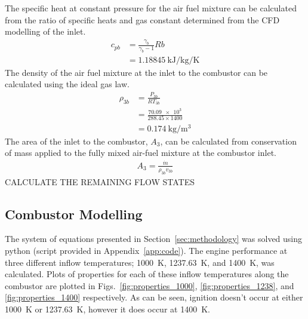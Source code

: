 \documentclass[a4paper]{article}
\begin{document}
The specific heat at constant pressure for the air fuel mixture can be calculated from the ratio of specific heats and gas constant determined from the CFD modelling of the inlet.
\begin{align}
    c_{pb} &= \frac{\gamma_b}{\gamma_b - 1}Rb\\
    &= \SI{1.18845}{\kJ\per\kg\per\K}
\end{align}
The density of the air fuel mixture at the inlet to the combustor can be calculated using the ideal gas law.
\begin{align}
    \rho_{3b} &= \frac{P_{3b}}{RT_{3b}}\\
    &= \frac{\num{70.09e3}}{288.45 \times 1400}\\
    &= \SI{0.174}{\kg\per\m\cubed}
\end{align}
The area of the inlet to the combustor, \(A_3\), can be calculated from conservation of mass applied to the fully mixed air-fuel mixture at the combustor inlet.
\begin{align}
    A_3 = \frac{\dot{m}}{\rho_{3b} v_{3b}}
\end{align}
CALCULATE THE REMAINING FLOW STATES


\subsection{Combustor Modelling}
The system of equations presented in Section~\ref{sec:methodology} was solved using python (script provided in Appendix~\ref{app:code}). The engine performance at three different inflow temperatures; 1000~K, 1237.63~K, and 1400~K, was calculated. Plots of properties for each of these inflow temperatures along the combustor are plotted in Figs.~\ref{fig:properties_1000}, \ref{fig:properties_1238}, and \ref{fig:properties_1400} respectively. As can be seen, ignition doesn't occur at either 1000~K or 1237.63~K, however it does occur at 1400~K.
\end{document}
